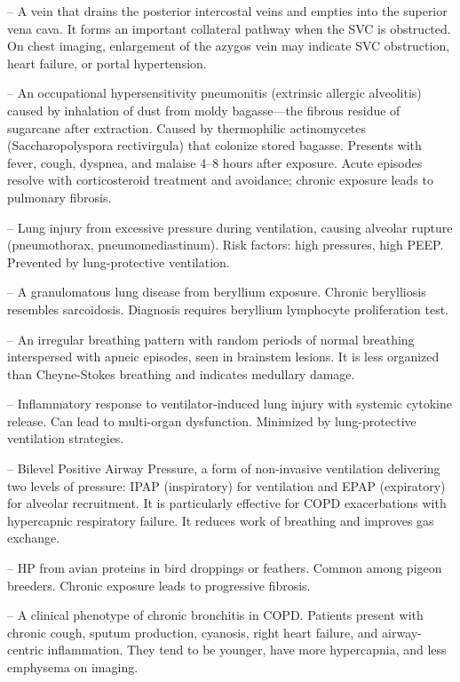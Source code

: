 -- A vein that drains the posterior intercostal veins and empties into the superior vena cava. It forms an important collateral pathway when the SVC is obstructed. On chest imaging, enlargement of the azygos vein may indicate SVC obstruction, heart failure, or portal hypertension.

-- An occupational hypersensitivity pneumonitis (extrinsic allergic alveolitis) caused by inhalation of dust from moldy bagasse—the fibrous residue of sugarcane after extraction. Caused by thermophilic actinomycetes (Saccharopolyspora rectivirgula) that colonize stored bagasse. Presents with fever, cough, dyspnea, and malaise 4--8 hours after exposure. Acute episodes resolve with corticosteroid treatment and avoidance; chronic exposure leads to pulmonary fibrosis.

-- Lung injury from excessive pressure during ventilation, causing alveolar rupture (pneumothorax, pneumomediastinum). Risk factors: high pressures, high PEEP. Prevented by lung-protective ventilation.

-- A granulomatous lung disease from beryllium exposure. Chronic berylliosis resembles sarcoidosis. Diagnosis requires beryllium lymphocyte proliferation test.

-- An irregular breathing pattern with random periods of normal breathing interspersed with apneic episodes, seen in brainstem lesions. It is less organized than Cheyne-Stokes breathing and indicates medullary damage.

-- Inflammatory response to ventilator-induced lung injury with systemic cytokine release. Can lead to multi-organ dysfunction. Minimized by lung-protective ventilation strategies.

-- Bilevel Positive Airway Pressure, a form of non-invasive ventilation delivering two levels of pressure: IPAP (inspiratory) for ventilation and EPAP (expiratory) for alveolar recruitment. It is particularly effective for COPD exacerbations with hypercapnic respiratory failure. It reduces work of breathing and improves gas exchange.

-- HP from avian proteins in bird droppings or feathers. Common among pigeon breeders. Chronic exposure leads to progressive fibrosis.

-- A clinical phenotype of chronic bronchitis in COPD. Patients present with chronic cough, sputum production, cyanosis, right heart failure, and airway-centric inflammation. They tend to be younger, have more hypercapnia, and less emphysema on imaging.

